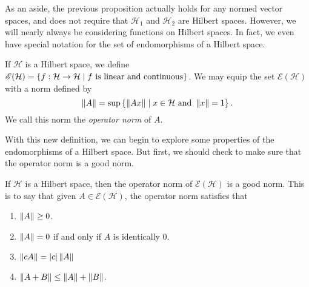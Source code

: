 As an aside, the previous proposition actually holds for any normed vector spaces, and does not require
that $\mathcal{H}_1$ and $\mathcal{H}_2$ are Hilbert spaces. However, we will nearly always be
considering functions on Hilbert spaces. In fact, we even have special notation for the set of
endomorphisms of a Hilbert space.
\begin{definition}
    If $\mathcal{H}$ is a Hilbert space, we define $\mathscr{E}(\mathcal{H}) = \left\{ f: \mathcal{H} \to
    \mathcal{H} \mid f \text{ is linear and continuous} \right\}$. We may equip the set
    $\mathscr{E}(\mathcal{H})$ with a norm defined by
    \[
        \left\| A \right\| = \sup \left\{ \left\| Ax \right\| \mid x \in \mathcal{H} \text{ and } \left\| x \right\| = 1 \right\}.
    \]
    We call this norm the \emph{operator norm} of $A$.
\end{definition}
With this new definition, we can begin to explore some properties of the endomorphisms of a Hilbert
space. But first, we should check to make sure that the operator norm is a good norm.
\begin{proposition}
    If $\mathcal{H}$ is a Hilbert space, then the operator norm of $\mathscr{E}(\mathcal{H})$ is a good
    norm. This is to say that given $A \in \mathscr{E}(\mathcal{H})$, the operator norm satisfies that
    \begin{enumerate}
        \item   $\left\| A \right\| \geq 0$.
        \item   $\left\| A \right\| = 0$ if and only if $A$ is identically $0$.
        \item   $\left\| cA \right\| = \left\vert c \right\vert\left\| A \right\|$
        \item   $\left\| A + B \right\| \leq \left\| A \right\| + \left\| B \right\|$.
    \end{enumerate}
\end{proposition}
